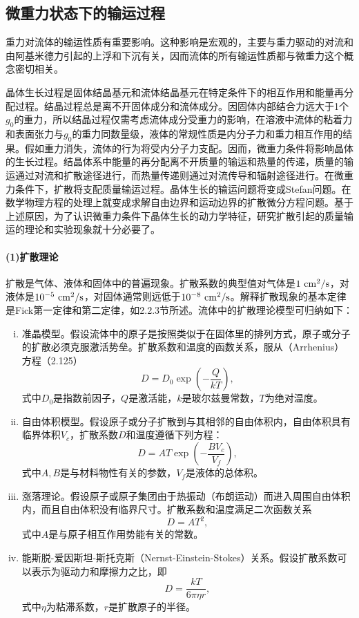 \subsection{微重力状态下的输运过程}
重力对流体的输运性质有重要影响。这种影响是宏观的，主要与重力驱动的对流和由阿基米德力引起的上浮和下沉有关，因而流体的所有输运性质都与微重力这个概念密切相关。

晶体生长过程是固体结晶基元和流体结晶基元在特定条件下的相互作用和能量再分配过程。结晶过程总是离不开固体成分和流体成分。因固体内部结合力远大于1个$g_0$的重力，所以结晶过程仅需考虑流体成分受重力的影响，在溶液中流体的粘着力和表面张力与$g_0$的重力同数量级，液体的常规性质是内分子力和重力相互作用的结果。假如重力消失，流体的行为将受内分子力支配。因而，微重力条件将影响晶体的生长过程。结晶体系中能量的再分配离不开质量的输运和热量的传递，质量的输运通过对流和扩散途径进行，而热量传递则通过对流传导和辐射途径进行。在微重力条件下，扩散将支配质量输运过程。晶体生长的输运问题将变成Stefan问题。在数学物理方程的处理上就变成求解自由边界和运动边界的扩散微分方程问题。基于上述原因，为了认识微重力条件下晶体生长的动力学特征，研究扩散引起的质量输运的理论和实验现象就十分必要了。

\paragraph{(1)扩散理论}扩散是气体、液体和固体中的普遍现象。扩散系数的典型值对气体是$\rm 1\ cm^2/s$，对液体是$10^{-5}\ \rm cm^2/s$，对固体通常则远低于$10^{-8}\ \rm cm^2/s$。解释扩散现象的基本定律是Fick第一定律和第二定律，如2.2.3节所述。流体中的扩散理论模型可归纳如下：

\begin{enumerate}[(i)]\itemsep -0.5ex
\item 准晶模型。假设流体中的原子是按照类似于在固体里的排列方式，原子或分子的扩散必须克服激活势垒。扩散系数和温度的函数关系，服从（Arrhenius）方程（2.125）
\begin{equation}
D=D_0\exp(-\frac{Q}{kT}),
\end{equation}
式中$D_0$是指数前因子，$Q$是激活能，$k$是玻尔兹曼常数，$T$为绝对温度。

\item 自由体积模型。假设原子或分子扩散到与其相邻的自由体积内，自由体积具有临界体积$V_c$，扩散系数$D$和温度遵循下列方程：
\begin{equation}
D=AT\exp(-\frac{BV_c}{V_f}),
\end{equation}
式中$A,B$是与材料物性有关的参数，$V_f$是液体的总体积。

\item 涨落理论。假设原子或原子集团由于热振动（布朗运动）而进入周围自由体积内，而且自由体积没有临界尺寸。扩散系数和温度满足二次函数关系
\begin{equation}
D=AT^2,
\end{equation}
式中$A$是与原子相互作用势能有关的常数。

\item 能斯脱-爱因斯坦-斯托克斯（Nernst-Einstein-Stokes）关系。假设扩散系数可以表示为驱动力和摩擦力之比，即
\begin{equation}
D=\frac{kT}{6\pi\eta r},
\end{equation}
式中$\eta$为粘滞系数，$r$是扩散原子的半径。
\end{enumerate}


